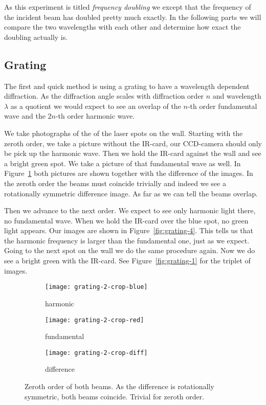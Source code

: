\documentclass[11pt, english, fleqn, DIV=15, headinclude, BCOR=2cm]{scrreprt}
\begin{document}
As this experiment is titled \emph{frequency doubling} we except that the
frequency of the incident beam has doubled pretty much exactly. In the
following parts we will compare the two wavelengths with each other and
determine how exact the doubling actually is.

\subsection{Grating}

The first and quick method is using a grating to have a wavelength dependent
diffraction. As the diffraction angle scales with diffraction order $n$ and
wavelength $\lambda$ as a quotient we would expect to see an overlap of the
$n$-th order fundamental wave and the $2n$-th order harmonic wave.

We take photographs of the of the laser spots on the wall. Starting with the
zeroth order, we take a picture without the IR-card, our CCD-camera should only
be pick up the harmonic wave. Then we hold the IR-card against the wall and see
a bright green spot. We take a picture of that fundamental wave as well. In
Figure~\ref{fig:grating-2} both pictures are shown together with the difference
of the images. In the zeroth order the beams must coincide trivially and indeed
we see a rotationally symmetric difference image. As far as we can tell the
beams overlap.

Then we advance to the next order. We expect to see only harmonic light there,
no fundamental wave. When we hold the IR-card over the blue spot, no green
light appears. Our images are shown in Figure~\ref{fig:grating-4}. This tells
us that the harmonic frequency is larger than the fundamental one, just as we
expect. Going to the next spot on the wall we do the same procedure again. Now
we do see a bright green with the IR-card. See Figure~\ref{fig:grating-1} for
the triplet of images.

\begin{figure}
    \centering
    \begin{subfigure}[c]{0.3\linewidth}
        \centering
        \texttt{[image: grating-2-crop-blue]}
        \caption{%
            harmonic
            }
    \end{subfigure}
    \hfill
    \begin{subfigure}[c]{0.3\linewidth}
        \centering
        \texttt{[image: grating-2-crop-red]}
        \caption{%
            fundamental
            }
    \end{subfigure}
    \hfill
    \begin{subfigure}[c]{0.3\linewidth}
        \centering
        \texttt{[image: grating-2-crop-diff]}
        \caption{%
            difference
            }
    \end{subfigure}
    \caption{%
        Zeroth order of both beams. As the difference is rotationally
        symmetric, both beams coincide. Trivial for zeroth order.
        }
    \label{fig:grating-2}
\end{figure}
\end{document}
